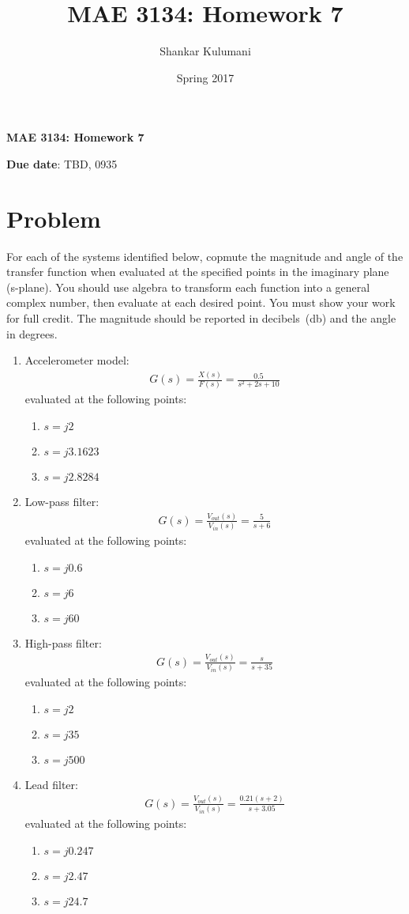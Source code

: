 \documentclass[11pt, reqno]{article}    %
\title{MAE 3134: Homework 7}
\author{Shankar Kulumani}
\date{Spring 2017}                          %
\begin{document}
{\noindent\Large \textbf{MAE 3134: Homework 7}}

\noindent \textbf{Due date}: TBD, 0935 \\
\section{Problem}
For each of the systems identified below, copmute the magnitude and angle of the transfer function when evaluated at the specified points in the imaginary plane (s-plane).
You should use algebra to transform each function into a general complex number, then evaluate at each desired point. 
You must show your work for full credit.
The magnitude should be reported in decibels~(\si{\decibel}) and the angle in degrees.
\begin{enumerate}
    \item Accelerometer model:
    \begin{align*}
        G(s) = \frac{X(s)}{F(s)} = \frac{0.5}{s^2 + 2 s + 10}
    \end{align*}
    evaluated at the following points:
    \begin{enumerate}
        \item \( s = j 2\) 
        \item \( s = j 3.1623\)
        \item \( s = j 2.8284\)
    \end{enumerate}
    \item Low-pass filter:
    \begin{align*}
        G(s) = \frac{V_{out}(s)}{V_{in}(s)} = \frac{5}{s + 6}
    \end{align*}
    evaluated at the following points:
    \begin{enumerate}
        \item \( s = j 0.6\) 
        \item \( s = j 6\)
        \item \( s = j 60\)
    \end{enumerate}
    \item High-pass filter:
    \begin{align*}
        G(s) = \frac{V_{out}(s)}{V_{in}(s)} = \frac{s}{s + 35}
    \end{align*}
    evaluated at the following points:
    \begin{enumerate}
        \item \( s = j 2\) 
        \item \( s = j 35\)
        \item \( s = j 500\)
    \end{enumerate}
    \item Lead filter:
    \begin{align*}
        G(s) = \frac{V_{out}(s)}{V_{in}(s)} = \frac{0.21(s+2)}{s + 3.05}
    \end{align*}
    evaluated at the following points:
    \begin{enumerate}
        \item \( s = j 0.247\) 
        \item \( s = j 2.47\)
        \item \( s = j 24.7\)
    \end{enumerate}
\end{enumerate}
\end{document}
